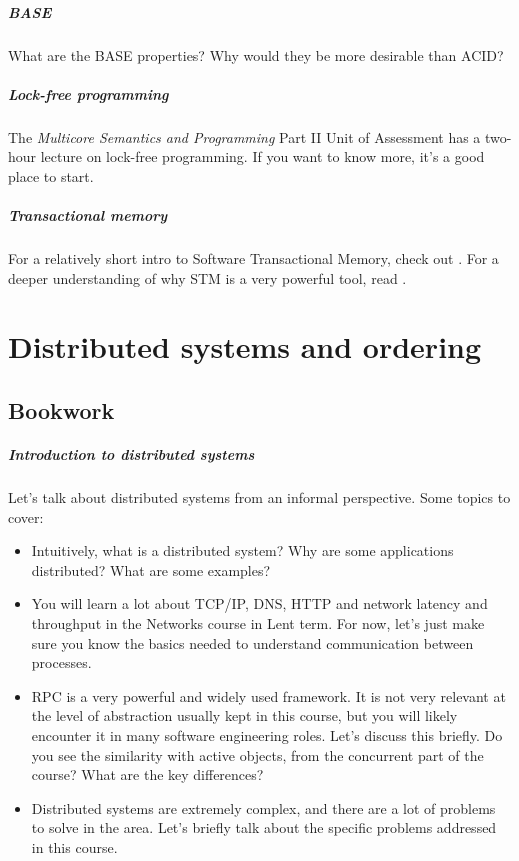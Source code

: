 \documentclass[12pt,a4paper,oneside,openright]{report}
\newcommand{\question}[2]{\paragraph{#1} #2}
\begin{document}
\question{BASE}{What are the BASE properties? Why would they be more
  desirable than ACID?}

\question{Lock-free programming}{The \emph{Multicore Semantics and
    Programming} Part II Unit of Assessment has a two-hour lecture on
  lock-free programming. If you want to know more, it's a good place
  to start.}

\question{Transactional memory}{For a relatively short intro to
  Software Transactional Memory, check out
  \cite[Chapter~18]{ArtMultiprocessorProgramming}. For a deeper
  understanding of why STM is a very powerful tool, read \cite{CMT}.}


\chapter{Distributed systems and ordering}

\section{Bookwork}

\question{Introduction to distributed systems}{Let's talk about
  distributed systems from an informal perspective. Some topics to
  cover:
  \begin{itemize}
  \item Intuitively, what is a distributed system? Why are some
    applications distributed? What are some examples?
  \item You will learn a lot about TCP/IP, DNS, HTTP and network
    latency and throughput in the Networks course in Lent term. For
    now, let's just make sure you know the basics needed to understand
    communication between processes.
  \item RPC is a very powerful and widely used framework. It is not
    very relevant at the level of abstraction usually kept in this
    course, but you will likely encounter it in many software
    engineering roles. Let's discuss this briefly. Do you see the
    similarity with active objects, from the concurrent part of the
    course? What are the key differences?
  \item Distributed systems are extremely complex, and there are a lot
    of problems to solve in the area. Let's briefly talk about the
    specific problems addressed in this course.
  \end{itemize}
}
\end{document}

